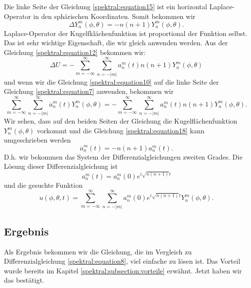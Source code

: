 Die linke Seite der Gleichung \eqref{spektral:equation15} ist ein horizontal Laplace-Operator in den sphärischen Koordinaten.
Somit bekommen wir
\begin{equation}
\Delta{Y_n^m(\phi, \theta)} = -n(n+1)Y_n^m(\phi, \theta).
\label{spektral:equation16}
\end{equation}
Laplace-Operator der Kugelfklächenfunktion ist proportional der Funktion selbst. Das ist sehr wichtige Eigenschaft, die wir gleich anwenden werden.
Aus der Gleichung \eqref{spektral:equation12} bekommen wir:
\begin{equation}
\Delta{U} = -\sum_{m=-\infty}^{\infty}\sum_{n=-|m|}^{\infty}a_n^m(t)n(n+1)Y_n^m(\phi, \theta)
\label{spektral:equation17}
\end{equation}
und wenn wir die Gleichung \eqref{spektral:equation10} auf die linke Seite der Gleichung \eqref{spektral:equation7} anwenden, bekommen wir
\begin{equation}
\sum_{m=-\infty}^{\infty}\sum_{n=-|m|}^{\infty}\ddot{a}_n^m(t)Y_n^m(\phi, \theta) = -\sum_{m=-\infty}^{\infty}\sum_{n=-|m|}^{\infty}a_n^m(t)n(n+1)Y_n^m(\phi, \theta).
\label{spektral:equation18}
\end{equation}
Wir sehen, dass auf den beiden Seiten der Gleichung die Kugelflächenfunktion $Y_n^m(\phi, \theta)$ vorkommt und die Gleichung \eqref{spektral:equation18} kann umgeschrieben werden
\begin{equation}
\ddot{a}_n^m(t) = -n(n+1)a_n^m(t).
\label{spektral:equation19}
\end{equation}
D.h. wir bekommen das System der Differenzialgleichungen zweiten Grades.
Die Lösung dieser Differenzialgleichung ist
\begin{equation}
a_n^m(t) = a_n^m(0)e^{i\sqrt{n(n+1)}t}
\label{spektral:equation20}
\end{equation}
und die gesuchte Funktion
\begin{equation}
u(\phi, \theta, t) = \sum_{m=-\infty}^{\infty}\sum_{n=-|m|}^{\infty}a_n^m(0)e^{i\sqrt{n(n+1)}t}Y_n^m(\phi, \theta).
\label{spektral:equation21}
\end{equation}

\subsection{Ergebnis
\label{spektral:subsection:ergebnis}}

Als Ergebnis bekommen wir die Gleichung, die im Vergleich zu Differenzialgleichung \eqref{spektral:equation8}, viel einfache zu lösen ist. Das Vorteil wurde bereits im Kapitel \ref{spektral:subsection:vorteile} erwähnt. Jetzt haben wir das bestätigt.
